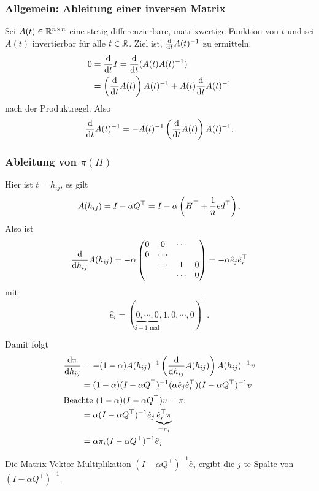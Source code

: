 \subsubsection*{Allgemein: Ableitung einer inversen Matrix}
Sei $A(t) \in \mathbb{R}^{n \times n}$ eine stetig differenzierbare, matrixwertige
Funktion von $t$ und sei $A(t)$ invertierbar für alle $t \in \mathbb{R}$. Ziel ist,
$\frac{\mathrm{d} }{\mathrm{d} t} A(t)^{-1}$ zu ermitteln.
\begin{align*}
  0
  &= \frac{\mathrm{d} }{\mathrm{d} t} I = \frac{\mathrm{d} }{\mathrm{d} t} (A(t) A(t)^{-1} ) \\
  &= \left( \frac{\mathrm{d} }{\mathrm{d} t} A(t) \right) A(t)^{-1} + A(t) \frac{\mathrm{d} }{\mathrm{d} t} A(t)^{-1}
\end{align*}
nach der Produktregel. Also
\[ \frac{\mathrm{d} }{\mathrm{d} t} A(t)^{-1} = - A(t)^{-1} \left( \frac{\mathrm{d} }{\mathrm{d} t} A(t) \right)
  A(t)^{-1}. \]

\subsubsection*{Ableitung von $\pi(H)$}
Hier ist $t = h_{ij}$, es gilt
\[ A(h_{ij}) = I - \alpha Q^\top
  = I - \alpha \left( H^\top + \frac{1}{n} ed^\top \right). \]
Also ist
\[ \frac{\mathrm{d} }{\mathrm{d} h_{ij}} A(h_{ij}) = - \alpha
  \begin{pmatrix}
    0 & 0 & \cdots \\
    0 & \cdots \\
    & \cdots & 1 & 0 \\
    & & \cdots & 0 \\
  \end{pmatrix}
  = - \alpha \hat{e}_j \hat{e}_i^\top
\]
mit
\[ \hat{e}_i = (\underbrace{0, \cdots, 0}_{i-1 \text{ mal}},
  1, 0, \cdots, 0)^\top. \]

Damit folgt
\begin{align*}
  \frac{\mathrm{d} \pi}{\mathrm{d} h_{ij}}
  &= -(1-\alpha) A(h_{ij})^{-1} \left( \frac{\mathrm{d} }{\mathrm{d} h_{ij}} A(h_{ij}) \right)
    A(h_{ij})^{-1} v \\
  &= (1-\alpha) (I - \alpha Q^\top)^{-1} (\alpha \hat{e}_j \hat{e}_i^\top)
    (I - \alpha Q^\top)^{-1} v \\
  \intertext{Beachte $(1-\alpha)(I-\alpha Q^\top) v = \pi$:}
  &= \alpha (I - \alpha Q^\top)^{-1} \hat{e}_j
    \underbrace{\hat{e}_i^\top \pi}_{= \pi_i} \\
  &= \alpha \pi_i (I - \alpha Q^\top)^{-1} \hat{e}_j
\end{align*}

Die Matrix-Vektor-Multiplikation $(I - \alpha Q^\top)^{-1} \hat{e}_j$ ergibt die
$j$-te Spalte von $(I-\alpha Q^\top)^{-1}$.

